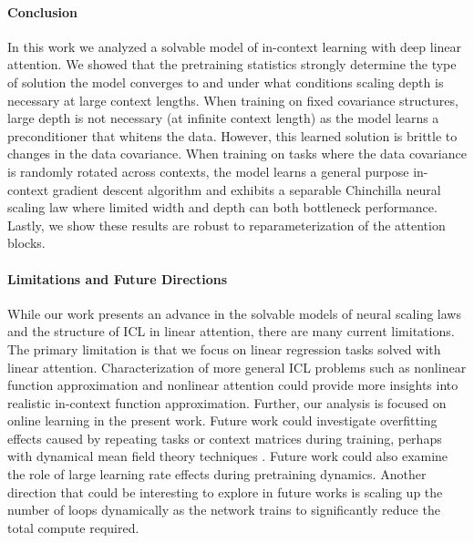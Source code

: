 \documentclass{article} %
\begin{document}
\paragraph{Conclusion} In this work we analyzed a solvable model of in-context learning with deep linear attention. We showed that the pretraining statistics strongly determine the type of solution the model converges to and under what conditions scaling depth is necessary at large context lengths. When training on fixed covariance structures, large depth is not necessary (at infinite context length) as the model learns a preconditioner that whitens the data. However, this learned solution is brittle to changes in the data covariance. When training on tasks where the data covariance is randomly rotated across contexts, the model learns a general purpose in-context gradient descent algorithm and exhibits a separable Chinchilla neural scaling law where limited width and depth can both bottleneck performance. Lastly, we show these results are robust to reparameterization of the attention blocks.  

\vspace{-10pt}

\paragraph{Limitations and Future Directions} While our work presents an advance in the solvable models of neural scaling laws and the structure of ICL in linear attention, there are many current limitations. The primary limitation is that we focus on linear regression tasks solved with linear attention. Characterization of more general ICL problems such as nonlinear function approximation and nonlinear attention could provide more insights into realistic in-context function approximation. Further, our analysis is focused on online learning in the present work. Future work could investigate overfitting effects caused by repeating tasks or context matrices during training, perhaps with dynamical mean field theory techniques \citep{mignacco2020dynamical, bordelon2024dynamical, montanari2025dynamical}. Future work could also examine the role of large learning rate effects during pretraining dynamics. Another direction that could be interesting to explore in future works is scaling up the number of loops dynamically as the network trains to significantly reduce the total compute required.
\end{document}
